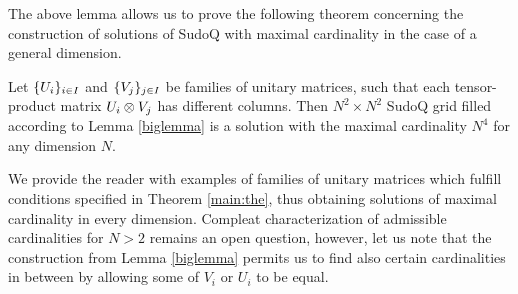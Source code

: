 \documentclass[11pt]{article}
\begin{document}
The above lemma allows us to prove the following theorem concerning the construction of solutions of SudoQ with maximal cardinality in the case of a general dimension.
\begin{theorem}\label{main:the}
    Let $\{\mathnormal{U}_i\}_{i\in I}$ and  $\{\mathnormal{V}_j\}_{j\in I}$ be families of unitary matrices, such that each tensor-product matrix $\mathnormal{U}_i\otimes\mathnormal{V}_j$ has different columns. Then $N^2\times N^2$ SudoQ grid filled according to Lemma \ref{biglemma} is a solution with the maximal cardinality $N^{4}$ for any dimension $N$.
\end{theorem}

We provide the reader with examples of families of unitary matrices which fulfill conditions specified in Theorem \ref{main:the}, thus obtaining solutions of maximal cardinality in every dimension. Compleat characterization of admissible cardinalities for $N>2$ remains an open question, however, let us note that the construction from Lemma \ref{biglemma} permits us to find also certain cardinalities in between by allowing some of $V_i$ or $U_i$ to be equal. 
\end{document}
